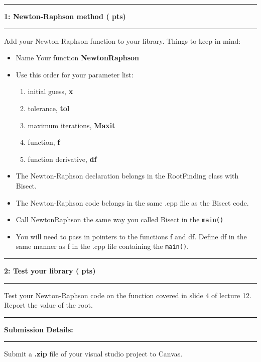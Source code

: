 \documentclass[11pt]{article}
\newcommand\question[2]{\vspace{.25in}\hrule\textbf{#1: #2}\vspace{.5em}\hrule\vspace{.10in}}
\begin{document}
\raggedright
\newcommand\Page{\page  / \lastPage}
\newcommand\page{1}
\newcommand\qN[2]{\Large {#1} \small{#2} \normalsize}

\newcommand\dueDate{\today}
\newcommand\hwnum{4}
\newcommand\ExNum{}

\newcommand\lastPage{3}

\lhead{\large Homework \hwnum }
\rhead{\rightHead}
\newcommand\rightHead{\large Due Oct 22, 2021}

\question{1}{Newton-Raphson method ( pts)}
Add your Newton-Raphson function to your library. Things to keep in mind:
\begin{itemize}
	\item Name Your function \textbf{NewtonRaphson}
	\item Use this order for your parameter list:
	\begin{enumerate}
		\item initial guess, \textbf{x}
		\item tolerance, \textbf{tol}
		\item maximum iterations, \textbf{Maxit}
		\item function, \textbf{f}
		\item function derivative, \textbf{df} 
	\end{enumerate}
	\item The Newton-Raphson declaration belongs in the RootFinding class with Bisect.
	\item The Newton-Raphson code belongs in the same .cpp file as the Bisect code.  
	\item Call NewtonRaphson the same way you called Bisect in the \texttt{main()}
	\item You will need to pass in pointers to the functions f and df. Define df in the same manner as f in the .cpp file containing the \texttt{main()}.
\end{itemize}

\vspace{1cm}

\question{2}{Test your library ( pts)}
Test your Newton-Raphson code on the function covered in slide 4 of lecture 12. Report the value of the root. \vspace{1cm}

\question{Submission Details}{}
Submit a \textbf{.zip} file of your visual studio project to Canvas.\\\vspace{0.5cm}
\end{document}
